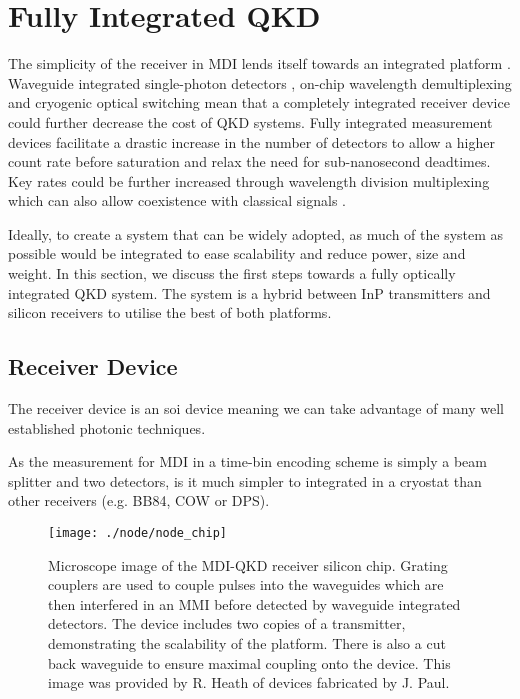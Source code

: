 \section{Fully Integrated QKD}

The simplicity of the receiver in \ac{MDI} lends itself towards an integrated platform \cite{wang2019}. Waveguide integrated single-photon detectors \cite{sprengers2011}, on-chip wavelength demultiplexing \cite{sugita2000} and cryogenic optical switching \cite{eltes2019} mean that a completely integrated receiver device could further decrease the cost of \ac{QKD} systems. Fully integrated measurement devices facilitate a drastic increase in the number of detectors to allow a higher count rate before saturation and relax the need for sub-nanosecond deadtimes. Key rates could be further increased through wavelength division multiplexing which can also allow coexistence with classical signals \cite{price2018}. 

Ideally, to create a system that can be widely adopted, as much of the system as possible would be integrated to ease scalability and reduce power, size and weight. In this section, we discuss the first steps towards a fully optically integrated \ac{QKD} system. The system is a hybrid between \ac{InP} transmitters and silicon receivers to utilise the best of both platforms.

\subsection{Receiver Device}

The receiver device is an \ac{soi} device meaning we can take advantage of many well established photonic techniques.

As the measurement for \ac{MDI} in a time-bin encoding scheme is simply a beam splitter and two detectors, is it much simpler to integrated in a cryostat than other receivers (e.g. BB84, COW or DPS).

\begin{figure}[tbp]
	\centering
	\texttt{[image: ./node/node\_chip]}
	\caption[Silicon MDI-QKD receiver with waveguide integrated detectors]{Microscope image of the MDI-QKD receiver silicon chip. Grating couplers are used to couple pulses into the waveguides which are then interfered in an MMI before detected by waveguide integrated detectors. The device includes two copies of a transmitter, demonstrating the scalability of the platform. There is also a cut back waveguide to ensure maximal coupling onto the device. This image was provided by R. Heath of devices fabricated by J. Paul.}
	\label{fig:node_chip}
\end{figure}

